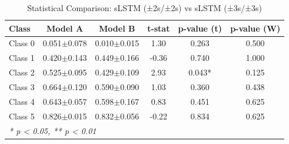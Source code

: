\begin{table}[htbp]
\centering
\caption{Statistical Comparison: sLSTM (±2s/±2s) vs sLSTM (±3s/±3s)}
\label{tab:comparison_class_slstm_±2s_±2s_vs_slstm_±3s_±3s}
\begin{tabular}{lccccc}
\toprule
\textbf{Class} & \textbf{Model A} & \textbf{Model B} & \textbf{t-stat} & \textbf{p-value (t)} & \textbf{p-value (W)} \\
\midrule
Class 0 & 0.051$\pm$0.078 & 0.010$\pm$0.015 & 1.30 & 0.263 & 0.500 \\
Class 1 & 0.420$\pm$0.143 & 0.449$\pm$0.166 & -0.36 & 0.740 & 1.000 \\
Class 2 & 0.525$\pm$0.095 & 0.429$\pm$0.109 & 2.93 & 0.043* & 0.125 \\
Class 3 & 0.664$\pm$0.120 & 0.590$\pm$0.090 & 1.03 & 0.360 & 0.438 \\
Class 4 & 0.643$\pm$0.057 & 0.598$\pm$0.167 & 0.83 & 0.451 & 0.625 \\
Class 5 & 0.826$\pm$0.015 & 0.832$\pm$0.056 & -0.22 & 0.834 & 0.625 \\
\bottomrule
\multicolumn{6}{l}{\textit{* p < 0.05, ** p < 0.01}} \\
\end{tabular}
\end{table}